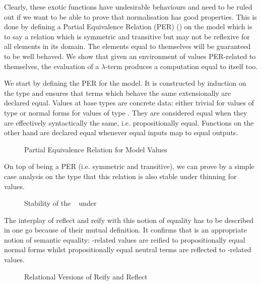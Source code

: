 Clearly, these exotic functions have undesirable behaviours and need to be ruled out
if we want to be able to prove that normalisation has good properties. This is done
by defining a Partial Equivalence Relation (PER) (\cite{mitchell1996foundations})
on the model which is to say a relation which is symmetric and transitive but may
not be reflexive for all elements in its domain. The elements equal to themselves will be
guaranteed to be well behaved. We show that given an environment of values PER-related to
themselves, the evaluation of a $λ$-term produces a computation equal to itself too.


We start by defining the PER for the model. It is constructed by induction on the type
and ensures that terms which behave the same extensionally are declared equal. Values at
base types are concrete data: either trivial for values of type  or normal
forms for values of type . They are considered equal when they are effectively
syntactically the same, i.e. propositionally equal. Functions on the other hand are
declared equal whenever equal inputs map to equal outputs.

\begin{figure}[h]
\caption{Partial Equivalence Relation for Model Values\label{fig:nbeper}}
\end{figure}

On top of being a PER (i.e. symmetric and transitive), we can prove by a simple case analysis
on the type that this relation is also stable under thinning for  values.

\begin{figure}[h]
\caption{Stability of the ~ under \label{fig:nbeperth}}
\end{figure}

The interplay of reflect and reify with this notion of equality has to be described
in one go because of their mutual definition. It confirms that  is an appropriate
notion of semantic equality: -related values are reified to propositionally
equal normal forms whilst propositionally equal neutral terms are reflected
to -related values.

\begin{figure}[h]
\caption{Relational Versions of Reify and Reflect\label{fig:nbeperreifyreflect}}
\end{figure}

